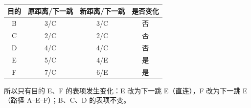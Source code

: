\begin{enumerate}[start=7]
\begin{center}
\begin{tabular}{cccc}
\toprule
目的 & 原距离/下一跳 & 新距离/下一跳 & 是否变化 \\
\midrule
B & 3/C & 3/C & 否 \\
C & 2/C & 2/C & 否 \\
D & 4/C & 4/C & 否 \\
E & 5/C & 4/E & 是 \\
F & 7/C & 6/E & 是 \\
\bottomrule
\end{tabular}
\end{center}
所以只有目的 E、F 的表项发生变化：E 改为下一跳 E（直连），F 改为下一跳 E（路径 A--E--F）；B、C、D 的表项不变。\else \answerarea[10] \fi

\end{enumerate}
